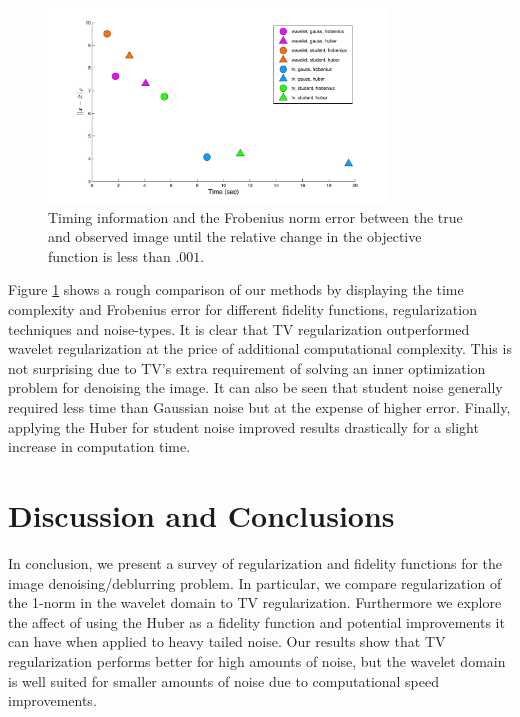 \documentclass[10pt,a4paper]{article}
\begin{document}
\begin{figure}[H]
	
	\begin{center}
		\includegraphics[width=0.8\textwidth]{../figures/comparePlot2.pdf}
		\caption{Timing information and the Frobenius norm error between the true and observed image until the relative change in the objective function is less than $.001$. }
		\label{comp_methods}
	\end{center}
\end{figure}


Figure \ref{comp_methods} shows a rough comparison of our methods by displaying the time complexity and Frobenius error for different fidelity functions, regularization techniques and noise-types. It is clear that TV regularization outperformed wavelet regularization at the price of additional computational complexity. This is not surprising due to TV's extra requirement of solving an inner optimization problem for denoising the image. It can also be seen that student noise generally required less time than Gaussian noise but at the expense of higher error. Finally, applying the Huber for student noise improved results drastically for a slight increase in computation time.  

\section{Discussion and Conclusions}

In conclusion, we present a survey of regularization and fidelity functions for the image denoising/deblurring problem. In particular, we compare regularization of the 1-norm in the wavelet domain to TV regularization. Furthermore we explore the affect of using the Huber as a fidelity function and potential improvements it can have when applied to heavy tailed noise. Our results show that TV regularization performs better for high amounts of noise, but the wavelet domain is well suited for smaller amounts of noise due to computational speed improvements. 
\end{document}
